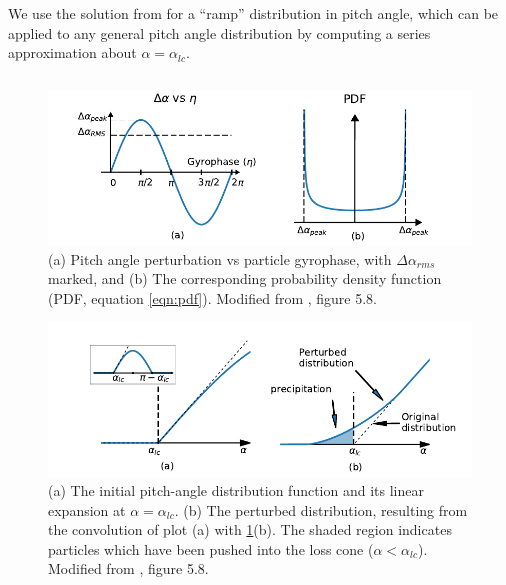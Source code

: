 We use the solution from \cite{Bortnik2005} for a ``ramp'' distribution in pitch angle, which can be applied to any general pitch angle distribution by computing a series approximation about $\alpha = \alpha_{lc}$.

\begin{equation}
\end{equation}


\begin{figure}[t]
\begin{center}
\includegraphics{figures/da_dist_and_pdf.pdf}
\caption[Pitch angle perturbation vs gyrophase, and corresponding PDF]{(a) Pitch angle perturbation vs particle gyrophase, with $\Delta \alpha_{rms}$ marked, and (b) The corresponding probability density function (PDF, equation \ref{eqn:pdf}). Modified from \cite{Bortnik2005}, figure 5.8.}
\label{fig:da_vs_eta_and_pdf}
\end{center}
\end{figure}

\begin{figure}[h]
\begin{center}
\includegraphics{figures/da_dist_and_perturbation.pdf}
\caption[Perturbed pitch-angle distribution]{(a) The initial pitch-angle distribution function and its linear expansion at $\alpha = \alpha_{lc}$. (b) The perturbed distribution, resulting from the convolution of plot (a) with \ref{fig:da_vs_eta_and_pdf}(b). The shaded region indicates particles which have been pushed into the loss cone ($\alpha < \alpha_{lc}$). Modified from \cite{Bortnik2005}, figure 5.8.}
\label{fig:da_dist_and_perturbation}
\end{center}
\end{figure}

